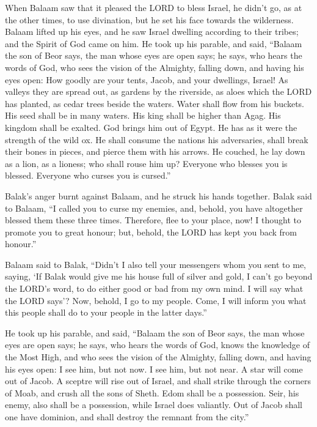  When Balaam saw that it pleased the LORD to bless Israel,
he didn't go, as at the other times, to use divination, but he set his
face towards the wilderness.  Balaam lifted up his eyes, and
he saw Israel dwelling according to their tribes; and the Spirit of God
came on him.  He took up his parable, and said, ``Balaam the
son of Beor says, the man whose eyes are open says;  he
says, who hears the words of God, who sees the vision of the Almighty,
falling down, and having his eyes open:  How goodly are your
tents, Jacob, and your dwellings, Israel!  As valleys they
are spread out, as gardens by the riverside, as aloes which the LORD has
planted, as cedar trees beside the waters.  Water shall flow
from his buckets. His seed shall be in many waters. His king shall be
higher than Agag. His kingdom shall be exalted.  God brings
him out of Egypt. He has as it were the strength of the wild ox. He
shall consume the nations his adversaries, shall break their bones in
pieces, and pierce them with his arrows.  He couched, he lay
down as a lion, as a lioness; who shall rouse him up? Everyone who
blesses you is blessed. Everyone who curses you is cursed.''

 Balak's anger burnt against Balaam, and he struck his
hands together. Balak said to Balaam, ``I called you to curse my
enemies, and, behold, you have altogether blessed them these three
times.  Therefore, flee to your place, now! I thought to
promote you to great honour; but, behold, the LORD has kept you back
from honour.''

 Balaam said to Balak, ``Didn't I also tell your messengers
whom you sent to me, saying,  `If Balak would give me his
house full of silver and gold, I can't go beyond the LORD's word, to do
either good or bad from my own mind. I will say what the LORD says'?
 Now, behold, I go to my people. Come, I will inform you
what this people shall do to your people in the latter days.''

 He took up his parable, and said, ``Balaam the son of Beor
says, the man whose eyes are open says;  he says, who hears
the words of God, knows the knowledge of the Most High, and who sees the
vision of the Almighty, falling down, and having his eyes open:
 I see him, but not now. I see him, but not near. A star
will come out of Jacob. A sceptre will rise out of Israel, and shall
strike through the corners of Moab, and crush all the sons of Sheth.
 Edom shall be a possession. Seir, his enemy, also shall be
a possession, while Israel does valiantly.  Out of Jacob
shall one have dominion, and shall destroy the remnant from the city.''

